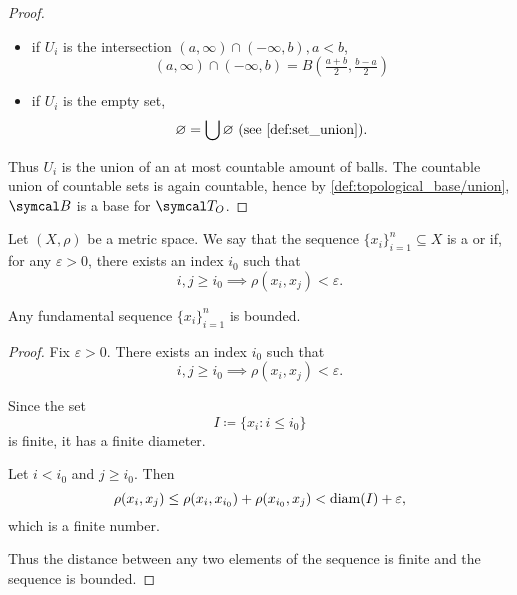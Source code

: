 \begin{proof}
\begin{itemize}
    \item if \( U_i \) is the intersection \( (a, \infty) \cap (-\infty, b), a < b \),
    \begin{equation*}
      (a, \infty) \cap (-\infty, b) = B(\tfrac {a + b} 2, \tfrac {b - a} 2)
    \end{equation*}

    \item if \( U_i \) is the empty set,
    \begin{equation*}
      \varnothing = \bigcup \varnothing \text{ (see \cref{def:set_union})}.
    \end{equation*}
  \end{itemize}

  Thus \( U_i \) is the union of an at most countable amount of balls. The countable union of countable sets is again countable, hence by \cref{def:topological_base/union}, \( \Cal{B} \) is a base for \( \Cal{T}_O \).
\end{proof}

\begin{definition}\label{def:fundamental_sequence}
  Let \( (X, \rho) \) be a metric space. We say that the sequence \( \{ x_i \}_{i=1}^n \subseteq X \) is a  or  if, for any \( \varepsilon > 0 \), there exists an index \( i_0 \) such that
  \begin{equation*}
    i, j \geq i_0 \implies \rho(x_i, x_j) < \varepsilon.
  \end{equation*}
\end{definition}

\begin{proposition}\label{thm:fundamental_sequence_is_bounded}
  Any fundamental sequence \( \{ x_i \}_{i=1}^n \) is bounded.
\end{proposition}
\begin{proof}
  Fix \( \varepsilon > 0 \). There exists an index \( i_0 \) such that
  \begin{equation*}
    i, j \geq i_0 \implies \rho(x_i, x_j) < \varepsilon.
  \end{equation*}

  Since the set
  \begin{equation*}
    I \coloneqq \{ x_i \colon i \leq i_0 \}
  \end{equation*}
  is finite, it has a finite diameter.

  Let \( i < i_0 \) and \( j \geq i_0 \). Then
  \begin{equation*}
    \rho(x_i, x_j) \leq \rho(x_i, x_{i_0}) + \rho(x_{i_0}, x_j) < \operatorname{diam}(I) + \varepsilon,
  \end{equation*}
  which is a finite number.

  Thus the distance between any two elements of the sequence is finite and the sequence is bounded.
\end{proof}

